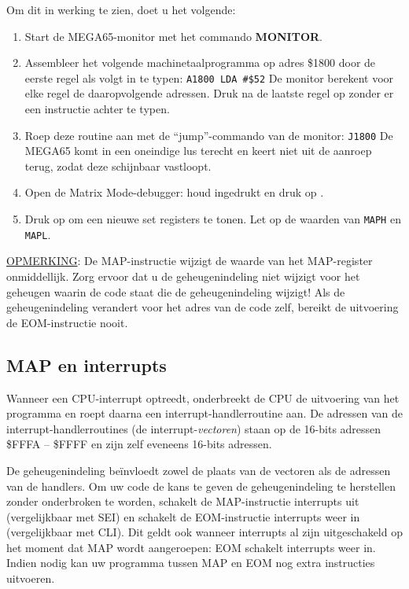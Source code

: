 Om dit in werking te zien, doet u het volgende:

\begin{enumerate}
\item Start de MEGA65-monitor met het commando {\bf MONITOR}.\item Assembleer het volgende machinetaalprogramma op adres \$1800 door de eerste regel als volgt in te typen: \texttt{A1800 LDA \#\$52} De monitor berekent voor elke regel de daaropvolgende adressen. Druk na de laatste regel op  zonder er een instructie achter te typen.


\item Roep deze routine aan met de ``jump''-commando van de monitor: \texttt{J1800} De MEGA65 komt in een oneindige lus terecht en keert niet uit de aanroep terug, zodat deze schijnbaar vastloopt.\item Open de Matrix Mode-debugger: houd \megasymbolkey ingedrukt en druk op .\item Druk op  om een nieuwe set registers te tonen. Let op de waarden van \texttt{MAPH} en \texttt{MAPL}.
\end{enumerate}

\underline{OPMERKING}: De MAP-instructie wijzigt de waarde van het MAP-register onmiddellijk. Zorg ervoor dat u de geheugenindeling niet wijzigt voor het geheugen waarin de code staat die de geheugenindeling wijzigt! Als de geheugenindeling verandert voor het adres van de code zelf, bereikt de uitvoering de EOM-instructie nooit.

\subsection{MAP en interrupts}

Wanneer een CPU-interrupt optreedt, onderbreekt de CPU de uitvoering van het programma en roept daarna een interrupt-handlerroutine aan. De adressen van de interrupt-handlerroutines (de interrupt-{\em vectoren}) staan op de 16-bits adressen \$FFFA -- \$FFFF en zijn zelf eveneens 16-bits adressen.

De geheugenindeling beïnvloedt zowel de plaats van de vectoren als de adressen van de handlers. Om uw code de kans te geven de geheugenindeling te herstellen zonder onderbroken te worden, schakelt de MAP-instructie interrupts uit (vergelijkbaar met SEI) en schakelt de EOM-instructie interrupts weer in (vergelijkbaar met CLI). Dit geldt ook wanneer interrupts al zijn uitgeschakeld op het moment dat MAP wordt aangeroepen: EOM schakelt interrupts weer in. Indien nodig kan uw programma tussen MAP en EOM nog extra instructies uitvoeren.

